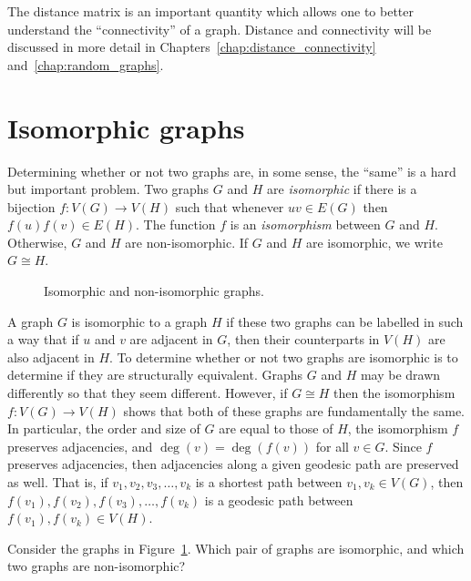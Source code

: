 The distance matrix is an important quantity which allows one to
better understand the ``connectivity'' of a graph. Distance and
connectivity will be discussed in more detail in
Chapters~\ref{chap:distance_connectivity}
and~\ref{chap:random_graphs}.



\section{Isomorphic graphs}
\label{chap:introduction:isomorphic_graphs}

Determining whether or not two graphs are, in some sense, the ``same''
is a hard but important problem. Two graphs $G$ and $H$ are
\emph{isomorphic} if there is a bijection
$f: V(G) \to V(H)$ such that whenever $uv \in E(G)$ then
$f(u) f(v) \in E(H)$. The function $f$ is an \emph{isomorphism}
between $G$ and $H$. Otherwise, $G$ and $H$ are non-isomorphic. If
$G$ and $H$ are isomorphic, we write $G \cong H$.
\index{$\cong$}

\begin{figure}[!htbp]
\centering

\caption{Isomorphic and non-isomorphic graphs.}
\label{fig:introduction:isomorphic_graphs}
\end{figure}

A graph $G$ is isomorphic to a graph $H$ if these two graphs can be
labelled in such a way that if $u$ and $v$ are adjacent in $G$, then
their counterparts in $V(H)$ are also adjacent in $H$. To determine
whether or not two graphs are isomorphic is to determine if they are
structurally equivalent. Graphs $G$ and $H$ may be drawn differently
so that they seem different. However, if $G \cong H$ then the
isomorphism $f: V(G) \to V(H)$ shows that both of these
graphs are fundamentally the same. In particular, the order and size
of $G$ are equal to those of $H$, the isomorphism $f$ preserves
adjacencies, and $\deg(v) = \deg(f(v))$ for all $v \in G$. Since $f$
preserves adjacencies, then adjacencies along a given geodesic path
are preserved as well. That is, if $v_1, v_2, v_3, \dots, v_k$ is a
shortest path between $v_1, v_k \in V(G)$, then
$f(v_1), f(v_2), f(v_3), \dots, f(v_k)$ is a geodesic path between
$f(v_1), f(v_k) \in V(H)$.

\begin{example}
Consider the graphs in
Figure~\ref{fig:introduction:isomorphic_graphs}. Which pair of graphs
are isomorphic, and which two graphs are non-isomorphic?
\end{example}

